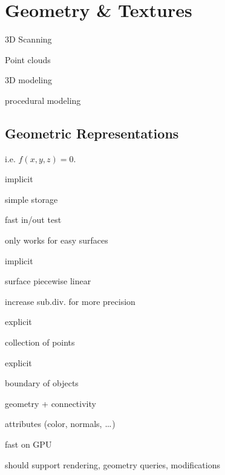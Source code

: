 \section{Geometry \& Textures}
\begin{definition}
  \begin{itemize*}
    \item 3D Scanning
    \item Point clouds
    \item 3D modeling
    \item procedural modeling
  \end{itemize*}
\end{definition}

\subsection{Geometric Representations}

\begin{definition}
  i.e. \(f(x, y , z) = 0\).
  \begin{itemize*}
    \item implicit
    \item simple storage
    \item fast in/out test
    \item only works for easy surfaces
  \end{itemize*}
\end{definition}

\begin{definition}
  \begin{itemize*}
    \item implicit
    \item surface piecewise linear
    \item increase sub.div. for more precision
  \end{itemize*}
\end{definition}

\begin{definition}
  \begin{itemize*}
    \item explicit
    \item collection of points
  \end{itemize*}
\end{definition}

\begin{definition}
  \begin{itemize*}
    \item explicit
    \item boundary of objects
    \item geometry + connectivity
    \item attributes (color, normals, \(\sdots\))
    \item fast on GPU
    \item should support rendering, geometry queries, modifications
  \end{itemize*}
\end{definition}

